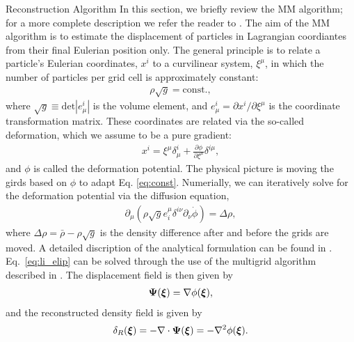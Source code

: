 \begin{section}{Reconstruction Algorithm}
  \label{sec:reconstruction}
  In this section, we briefly review the MM algorithm; for a more
  complete description we refer the reader to \cite{bib:ZhuH2016}.  
  The aim of the MM algorithm is to estimate the displacement of particles in 
  Lagrangian coordiantes from their final Eulerian position only. The
  general principle is to relate a particle's Eulerian coordinates, $x^i$ to
  a curvilinear system, $\xi^\mu$, in which the number of particles
  per grid cell is approximately constant:
  \begin{align}
   \label{eq:const}
    \rho \sqrt{g}=\mathrm{const.},
  \end{align}
  where $\sqrt{g} \equiv \mathrm{det}\left| e^i_\mu\right|$ is the volume
  element, and $e^i_\mu = \partial x^i / \partial \xi ^ \mu$ is the
  coordinate transformation matrix. 
  These coordinates are
  related via the so-called deformation, which we assume to be a pure
  gradient:
  \begin{align}
    x^i = \xi^\mu \delta^i_\mu + \frac{\partial \phi}{\partial
    \xi^\mu}\delta^{i\mu},
  \end{align}
  and $\phi$ is called the deformation potential.  The physical picture is moving the girds 
  based on $\phi$ to adapt Eq. \ref{eq:const}.  Numerially, we 
  can iteratively solve for
  the deformation potential via the diffusion equation, 
  \begin{align}
    \label{eq:li_elip}
    \partial _\mu (\rho \sqrt{g} e^\mu _i \delta^{i\nu}
    \partial_\nu \dot{\phi})=\Delta \rho,
  \end{align}
  where $\Delta \rho = \bar{\rho}-\rho \sqrt{g}$ is the density difference after and 
  before the grids are moved. A detailed discription 
  of the analytical formulation can be found in \cite{bib:Pen1995,bib:Pen1998}.
  Eq.~\ref{eq:li_elip} can be solved through the use of the multigrid
  algorithm described in \cite{bib:Pen1995,bib:Pen1998,bib:ZhuH2016}.
  The displacement field is then given by
  \begin{align}
   \label{eq:disp}
   \boldsymbol{\Psi}(\boldsymbol{\xi})=\nabla \phi(\boldsymbol{\xi}),
  \end{align}
  and the reconstructed density field is given by
  \begin{align}
   \label{eq:delta}
   \delta_R(\boldsymbol{\xi})=- \nabla \cdot \boldsymbol{\Psi}(\boldsymbol{\xi}) = - \nabla^2 \phi(\boldsymbol{\xi}). 
  \end{align}

\end{section}

